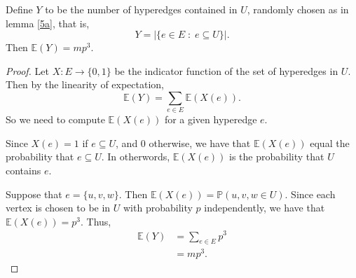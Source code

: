 \documentclass{unswmaths}
\begin{document}
\begin{lemma}[Part (b)]
\label{5b}
    Define $Y$ to be the number of hyperedges contained in $U$, randomly
    chosen as in lemma \ref{5a}, that is,
    \begin{equation}
        Y = |\{e \in E\;:\;e \subseteq U\}|.
    \end{equation}
    Then $\mathbb{E}(Y) = mp^3$.
\end{lemma}
\begin{proof}
    Let $X:E\to \{0,1\}$ be the indicator function
    of the set of hyperedges in $U$.
    Then by the linearity of expectation,
    \begin{equation*}
        \mathbb{E}(Y) = \sum_{e \in E} \mathbb{E}(X(e)).
    \end{equation*}
    So we need to compute $\mathbb{E}(X(e))$ for a given
    hyperedge $e$. 
    
    Since $X(e) = 1$ if $e \subseteq U$, and $0$ otherwise,
    we have that $\mathbb{E}(X(e))$ equal the probability
    that $e \subseteq U$. In otherwords, $\mathbb{E}(X(e))$
    is the probability that $U$ contains $e$. 
     
    Suppose that $e = \{u,v,w\}$. Then $\mathbb{E}(X(e)) = \mathbb{P}(u,v,w \in U)$. 
    Since each vertex is chosen to be in $U$ with probability $p$ independently,
    we have that $\mathbb{E}(X(e)) = p^3$. 
    Thus,
    \begin{align*}
        \mathbb{E}(Y) &= \sum_{e \in E} p^3\\
                      &= mp^3.
    \end{align*}
\end{proof}
\end{document}
